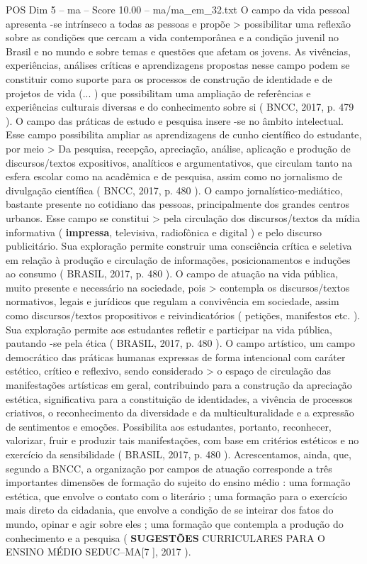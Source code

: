 \begin{textsample}{POS Dim 5 – ma – Score 10.00 – ma/ma\_em\_32.txt}
O campo da vida pessoal apresenta -se intrínseco a todas as pessoas e propõe > possibilitar uma reflexão sobre as condições que cercam a vida contemporânea e a condição juvenil no Brasil e no mundo e sobre temas e questões que afetam os jovens.
As vivências, experiências, análises críticas e aprendizagens propostas nesse campo podem se constituir como suporte para os processos de construção de identidade e de projetos de vida (... ) que possibilitam uma ampliação de referências e experiências culturais diversas e do conhecimento sobre si ( BNCC, 2017, p. 479 ).
O campo das práticas de estudo e pesquisa insere -se no âmbito intelectual.
Esse campo possibilita ampliar as aprendizagens de cunho científico do estudante, por meio > Da pesquisa, recepção, apreciação, análise, aplicação e produção de discursos/textos expositivos, analíticos e argumentativos, que circulam tanto na esfera escolar como na acadêmica e de pesquisa, assim como no jornalismo de divulgação científica ( BNCC, 2017, p. 480 ).
O campo jornalístico-mediático, bastante presente no cotidiano das pessoas, principalmente dos grandes centros urbanos.
Esse campo se constitui > pela circulação dos discursos/textos da mídia informativa ( \textbf{impressa}, televisiva, radiofônica e digital ) e pelo discurso publicitário.
Sua exploração permite construir uma consciência crítica e seletiva em relação à produção e circulação de informações, posicionamentos e induções ao consumo ( BRASIL, 2017, p. 480 ).
O campo de atuação na vida pública, muito presente e necessário na sociedade, pois > contempla os discursos/textos normativos, legais e jurídicos que regulam a convivência em sociedade, assim como discursos/textos propositivos e reivindicatórios ( petições, manifestos etc. ).
Sua exploração permite aos estudantes refletir e participar na vida pública, pautando -se pela ética ( BRASIL, 2017, p. 480 ).
O campo artístico, um campo democrático das práticas humanas expressas de forma intencional com caráter estético, crítico e reflexivo, sendo considerado > o espaço de circulação das manifestações artísticas em geral, contribuindo para a construção da apreciação estética, significativa para a constituição de identidades, a vivência de processos criativos, o reconhecimento da diversidade e da multiculturalidade e a expressão de sentimentos e emoções.
Possibilita aos estudantes, portanto, reconhecer, valorizar, fruir e produzir tais manifestações, com base em critérios estéticos e no exercício da sensibilidade ( BRASIL, 2017, p. 480 ).
Acrescentamos, ainda, que, segundo a BNCC, a organização por campos de atuação corresponde a três importantes dimensões de formação do sujeito do ensino médio : uma formação estética, que envolve o contato com o literário ; uma formação para o exercício mais direto da cidadania, que envolve a condição de se inteirar dos fatos do mundo, opinar e agir sobre eles ; uma formação que contempla a produção do conhecimento e a pesquisa ( \textbf{SUGESTÕES} CURRICULARES PARA O ENSINO MÉDIO SEDUC–MA[7 ], 2017 ).

\end{textsample}
